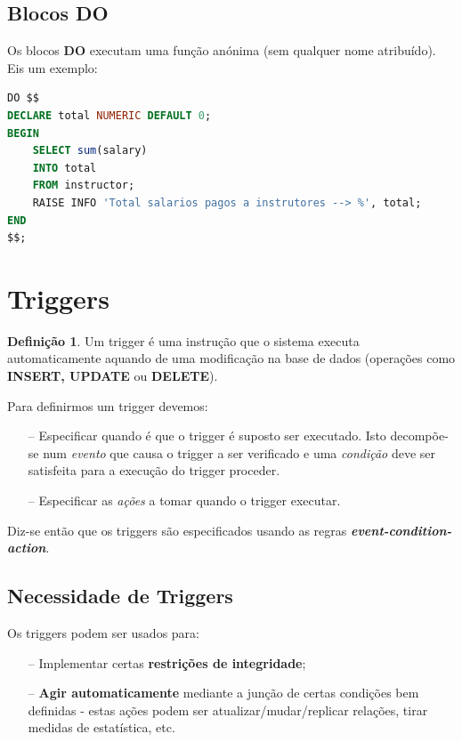 \documentclass[oneside]{book}
\theoremstyle{definition}
\newtheorem{definition}{Definição}
\begin{document}
\subsection{Blocos DO}
Os blocos \textbf{DO} executam uma função anónima (sem qualquer nome atribuído). Eis um exemplo:
\begin{lstlisting}[language=SQL, morekeywords={DECLARE, FOR, DO, $$, RAISE, INFO}, framesep=8pt, xleftmargin=40pt, framexleftmargin=40pt, frame=tb, framerule=0pt]
DO $$
DECLARE total NUMERIC DEFAULT 0;
BEGIN
    SELECT sum(salary)
    INTO total
    FROM instructor;
    RAISE INFO 'Total salarios pagos a instrutores --> %', total;
END
$$;
\end{lstlisting}



\section{Triggers}
\begin{definition}
    Um trigger é uma instrução que o sistema executa automaticamente aquando de uma modificação na base de dados (operações como \textbf{INSERT, UPDATE} ou \textbf{DELETE}).
\end{definition}

Para definirmos um trigger devemos:
\begin{itemize}
    \itemsep0cm
    \item[--] Especificar quando é que o trigger é suposto ser executado. Isto decompõe-se num \textit{evento} que causa o trigger a ser verificado e uma \textit{condição} deve ser satisfeita para a execução do trigger proceder.
    \item[--] Especificar as \textit{ações} a tomar quando o trigger executar.
\end{itemize}
Diz-se então que os triggers são especificados usando as regras \textbf{\textit{event-condition-action}}.

\subsection{Necessidade de Triggers}
Os triggers podem ser usados para:
\begin{itemize}
    \itemsep0cm
    \item[--] Implementar certas \textbf{restrições de integridade};
    \item[--] \textbf{Agir automaticamente} mediante a junção de certas condições bem definidas - estas ações podem ser atualizar/mudar/replicar relações, tirar medidas de estatística, etc.
\end{itemize}
\end{document}
